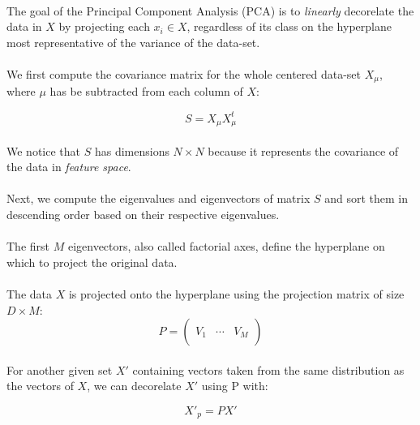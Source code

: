 
\paragraph{}
The goal of the Principal Component Analysis (PCA) is to \emph{linearly} decorelate the data in $X$ by projecting each $x_i \in X$, regardless of its class on the hyperplane most representative of the variance of the data-set.

\paragraph{}
We first compute the covariance matrix for the whole centered data-set $X_\mu$, where $\mu$ has be subtracted from each column of $X$:

$$ S = X_\mu X_\mu ^t$$

\paragraph{}
We notice that $S$ has dimensions $N \times N$ because it represents the covariance of the data in \emph{feature space}.

\paragraph{}
Next, we compute the eigenvalues and eigenvectors of matrix $S$ and sort them in descending order based on their respective eigenvalues.

\paragraph{}
The first $M$ eigenvectors, also called factorial axes, define the hyperplane on which to project the original data.

\paragraph{}
The data $X$ is projected onto the hyperplane using the projection matrix of size $D \times M$:
$$ P = \left( \begin{array}{ccc}
 &  &  \\
V_1 & \cdots & V_M \\
 &  &  \end{array} \right) $$ 

\paragraph{}
For another given set $X'$ containing vectors taken from the same distribution as the vectors of $X$, we can decorelate $X'$ using P with:

$$ X'_p = PX'$$
